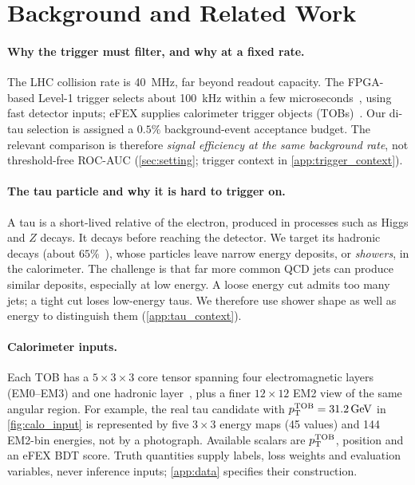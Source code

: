 \section{Background and Related Work}
\label{sec:background}

\paragraph{Why the trigger must filter, and why at a fixed rate.}
The LHC collision rate is \SI{40}{MHz}, far beyond readout capacity. The FPGA-based Level-1 trigger selects about \SI{100}{kHz} within a few microseconds~\cite{atlas_trigger_run3}, using fast detector inputs; eFEX supplies calorimeter trigger objects (TOBs)~\cite{atlas_phase1_tdr}. Our di-tau selection is assigned a $0.5\%$ background-event acceptance budget. The relevant comparison is therefore \emph{signal efficiency at the same background rate}, not threshold-free ROC-AUC (\cref{sec:setting}; trigger context in \cref{app:trigger_context}).

\paragraph{The tau particle and why it is hard to trigger on.}
A tau is a short-lived relative of the electron, produced in processes such as Higgs and $Z$ decays. It decays before reaching the detector. We target its hadronic decays (about $65\%$~\cite{pdg2024}), whose particles leave narrow energy deposits, or \emph{showers}, in the calorimeter. The challenge is that far more common QCD jets can produce similar deposits, especially at low energy. A loose energy cut admits too many jets; a tight cut loses low-energy taus. We therefore use shower shape as well as energy to distinguish them (\cref{app:tau_context}).

\paragraph{Calorimeter inputs.}
Each TOB has a $5\times3\times3$ core tensor spanning four electromagnetic layers (EM0--EM3) and one hadronic layer~\cite{atlas_detector}, plus a finer $12\times12$ EM2 view of the same angular region. For example, the real tau candidate with $p_{\mathrm{T}}^{\mathrm{TOB}}=\SI{31.2}{GeV}$ in \cref{fig:calo_input} is represented by five $3\times3$ energy maps (45 values) and 144 EM2-bin energies, not by a photograph. Available scalars are $p_{\mathrm{T}}^{\mathrm{TOB}}$, position and an eFEX BDT score. Truth quantities supply labels, loss weights and evaluation variables, never inference inputs; \cref{app:data} specifies their construction.

